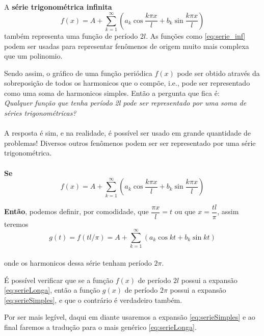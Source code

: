 A \textbf{série trigonométrica infinita}\\ 
\begin{equation}
    f(x) = A + \sum\limits_{k=1}^{\infty}(a_k\cos{\dfrac{k\pi x}{l}} + b_k\sin{\dfrac{k\pi x}{l}})
\label{eq:serie_inf}
\end{equation}
também representa uma função de período $2l$. As funções como \ref{eq:serie_inf} podem
ser usadas para representar fenômenos de origem muito mais complexa que um polinomio.

Sendo assim, o gráfico de uma função periódica $f(x)$ pode ser obtido através da 
sobreposição de todos os harmonicos que o compõe, i.e., pode ser representado
como uma soma de harmonicos simples.
Então a pergunta que fica é:\\
\textit{Qualquer função que tenha período 2l pode ser representado por uma soma de séries 
trigonométricas?}\\
\\
A resposta é sim, e na realidade, é possível ser usado em grande quantidade de problemas!
Diversos outros fenômenos podem ser ser representado por uma série trigonométrica.
\\
\\  

\textbf{Se}
\begin{equation}
    f(x) = A + \sum\limits_{k=1}^{\infty}(a_k\cos{\dfrac{k\pi x}{l}} + b_k\sin{\dfrac{k\pi x}{l}})
\label{eq:serieLonga}
\end{equation}

\textbf{Então}, podemos definir, por comodidade, que $\dfrac{\pi x}{l} = t$ ou que $x = \dfrac{tl}{\pi}$,
assim teremos\\
\begin{equation}
    g(t) = f(tl/\pi) = A + \sum\limits_{k=1}^{\infty}(a_k\cos{kt} + b_k\sin{kt})
\label{eq:serieSimples}
\end{equation}
\\
onde os harmonicos dessa série tenham período $2\pi$. 

É possível verificar que se a função $f(x)$ de período $2l$ possui a expansão 
\ref{eq:serieLonga}, então a função $g(x)$ de período $2\pi$ possui a expansão 
\ref{eq:serieSimples}, e que o contrário é verdadeiro também. 

Por ser mais legível, daqui em diante usaremos a expansão \ref{eq:serieSimples} 
e ao final faremos a tradução para o mais genérico \ref{eq:serieLonga}.\\
